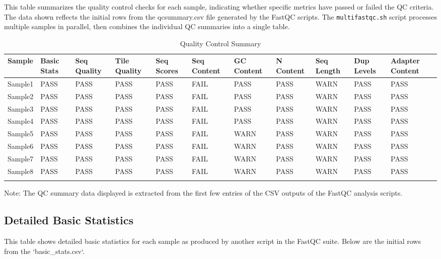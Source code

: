 \documentclass[unnumsec,webpdf,contemporary,large]{oup-authoring-template}
\theoremstyle{thmstyleone}%
\theoremstyle{thmstyletwo}%
\theoremstyle{thmstylethree}%
\begin{document}
This table summarizes the quality control checks for each sample, indicating whether specific metrics have passed or failed the QC criteria. The data shown reflects the initial rows from the qcsummary.csv file generated by the FastQC scripts. The \texttt{multifastqc.sh} script processes multiple samples in parallel, then combines the individual QC summaries into a single table.

\begin{table}[htbp]
\caption{Quality Control Summary\label{tab1}}
\centering
\begin{tabular}{@{}lllllllllll@{}}
\toprule
Sample & Basic Stats & Seq Quality & Tile Quality & Seq Scores & Seq Content & GC Content & N Content & Seq Length & Dup Levels & Adapter Content \\
\midrule
Sample1 & PASS & PASS & PASS & PASS & FAIL & PASS & PASS & WARN & PASS & PASS \\
Sample2 & PASS & PASS & PASS & PASS & FAIL & PASS & PASS & WARN & PASS & PASS \\
Sample3 & PASS & PASS & PASS & PASS & FAIL & PASS & PASS & WARN & PASS & PASS \\
Sample4 & PASS & PASS & PASS & PASS & FAIL & PASS & PASS & WARN & PASS & PASS \\
Sample5 & PASS & PASS & PASS & PASS & FAIL & WARN & PASS & WARN & PASS & PASS \\
Sample6 & PASS & PASS & PASS & PASS & FAIL & WARN & PASS & WARN & PASS & PASS \\
Sample7 & PASS & PASS & PASS & PASS & FAIL & WARN & PASS & WARN & PASS & PASS \\
Sample8 & PASS & PASS & PASS & PASS & FAIL & WARN & PASS & WARN & PASS & PASS \\
\botrule
\end{tabular}
\begin{tablenotes}%
\item Note: The QC summary data displayed is extracted from the first few entries of the CSV outputs of the FastQC analysis scripts.
\end{tablenotes}
\end{table}

\subsection{Detailed Basic Statistics}

This table shows detailed basic statistics for each sample as produced by another script in the FastQC suite. Below are the initial rows from the `basic_stats.csv`.
\end{document}
